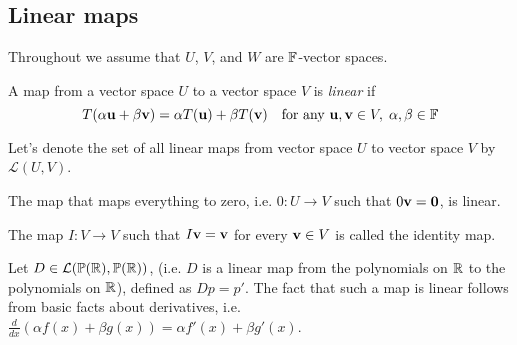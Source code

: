 \documentclass{article}
\begin{document}


\subsection{Linear maps}
\label{sec:lin_maps}
Throughout we assume that $U$, $V$, and $W$ are ${\mathbb{F}}$-vector spaces.

\begin{definition}
A map from a vector space $U$ to a vector space $V$ is \emph{linear} if
\begin{equation*}
    T(\alpha {\mathbf{u}} + \beta {\mathbf{v}}) = \alpha T({\mathbf{u}}) + \beta T({\mathbf{v}}) \quad \text{for any } {\mathbf{u}}, {\mathbf{v}} \in V, \; \alpha, \beta \in {\mathbb{F}}
\end{equation*}
\end{definition}

Let's denote the set of all linear maps from vector space $U$ to vector space $V$ by $\mathcal{L}(U,V)$.

\begin{example}
The map that maps everything to zero, i.e. $0:U \to V$ such that $0 {\mathbf{v}} = {\mathbf{0}}$, is linear. 
\end{example}

\begin{example}
The map $I: V \to V$ such that $I {\mathbf{v}} = {\mathbf{v}}$ for every ${\mathbf{v}} \in V$ is called the identity map. 
\end{example}

\begin{example}
\label{ex:diff_map}
Let $D \in \mathcal{L}(\mathbb{P}({\mathbb{R}}),\mathbb{P}({\mathbb{R}}))$, (i.e. $D$ is a linear map from the polynomials on ${\mathbb{R}}$ to  the polynomials on ${\mathbb{R}}$), defined as $Dp = p'$. The fact that such a map is linear follows from basic facts about derivatives, i.e. $\frac{d}{dx} (\alpha f(x) + \beta g(x)) = \alpha f'(x) + \beta g'(x)$.

\end{example}
\end{document}
